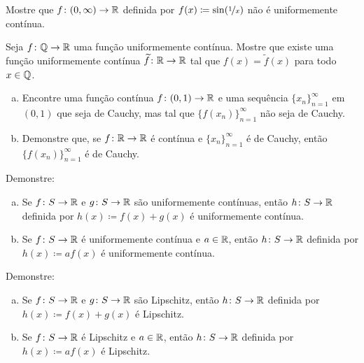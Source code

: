 \begin{exercise}
Mostre que $f \colon (0,\infty) \to {\mathbb{R}}$ definida por
$f(x) \coloneqq \sin(\nicefrac{1}{x})$ não é uniformemente contínua.
\end{exercise}

\begin{exercise}[Desafiador]
Seja $f \colon {\mathbb{Q}} \to {\mathbb{R}}$ uma função uniformemente contínua. Mostre que
existe uma função uniformemente contínua $\widetilde{f} \colon {\mathbb{R}} \to {\mathbb{R}}$
tal que $f(x) = \widetilde{f}(x)$ para todo $x \in {\mathbb{Q}}$.
\end{exercise}

\begin{samepage}
\begin{exercise}
\leavevmode
\begin{enumerate}[a)]
\item
Encontre uma função contínua $f \colon (0,1) \to {\mathbb{R}}$ e uma sequência
$\{ x_n \}_{n=1}^\infty$ em $(0,1)$ que seja de Cauchy, mas tal que
$\bigl\{ f(x_n) \bigr\}_{n=1}^\infty$ não seja de Cauchy.
\item
Demonstre que, se $f \colon {\mathbb{R}} \to {\mathbb{R}}$ é contínua e
$\{ x_n \}_{n=1}^\infty$ é de Cauchy, então
$\bigl\{ f(x_n) \bigr\}_{n=1}^\infty$ é de Cauchy.
\end{enumerate}
\end{exercise}
\end{samepage}

\begin{samepage}
\begin{exercise}
Demonstre:
\begin{enumerate}[a)]
\item
Se $f \colon S \to {\mathbb{R}}$ e $g \colon S \to {\mathbb{R}}$ são uniformemente contínuas,
então $h \colon S \to {\mathbb{R}}$ definida por $h(x) \coloneqq f(x) + g(x)$
é uniformemente contínua.
\item
Se $f \colon S \to {\mathbb{R}}$ é uniformemente contínua e $a \in {\mathbb{R}}$,
então $h \colon S \to {\mathbb{R}}$ definida por $h(x) \coloneqq a f(x)$
é uniformemente contínua.
\end{enumerate}
\end{exercise}
\end{samepage}

\begin{exercise}
Demonstre:
\begin{enumerate}[a)]
\item
Se $f \colon S \to {\mathbb{R}}$ e $g \colon S \to {\mathbb{R}}$ são Lipschitz,
então $h \colon S \to {\mathbb{R}}$ definida por $h(x) \coloneqq f(x) + g(x)$
é Lipschitz.
\item
Se $f \colon S \to {\mathbb{R}}$ é Lipschitz e $a \in {\mathbb{R}}$,
então $h \colon S \to {\mathbb{R}}$ definida por $h(x) \coloneqq a f(x)$
é Lipschitz.
\end{enumerate}
\end{exercise}

